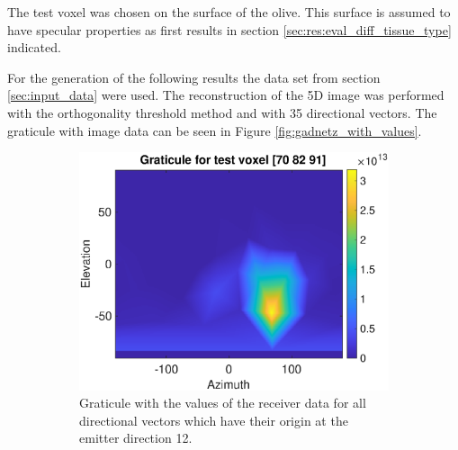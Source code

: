 The test voxel was chosen on the surface of the olive. This surface is assumed to have specular properties as first results in section \ref{sec:res:eval_diff_tissue_type} indicated. 

\bigskip

For the generation of the following results the data set from section \ref{sec:input_data} were used. The reconstruction of the 5D image was performed with the orthogonality threshold method and with 35 directional vectors. The graticule with image data can be seen in Figure \ref{fig:gadnetz_with_values}.



\begin{figure}[H]
     \centering
     \begin{subfigure}[b]{0.77\textwidth}
                  \centering
         \includegraphics[width=1.09\textwidth]{Graphics/Results/gradnetz/graticule_with_values.eps}
         \caption{Graticule with the values of the receiver data for all directional vectors which have their origin at the emitter direction 12.}
         \label{fig:gadnetz_with_value_values}
     \end{subfigure}
\hfill
     \begin{subfigure}[b]{0.77\textwidth}
         \centering

\end{subfigure}
\end{figure}
